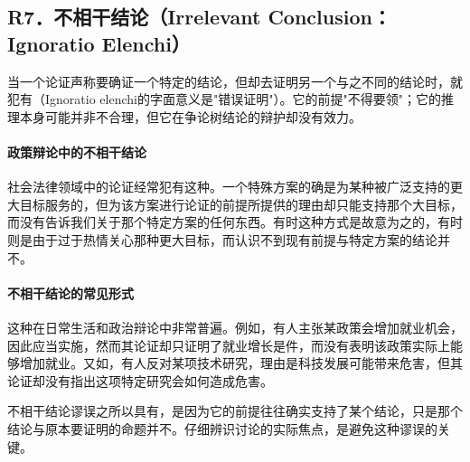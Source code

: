 \subsection{R7．不相干结论（Irrelevant Conclusion：Ignoratio Elenchi）}

\begin{theorembox}[title=不相干结论谬误的定义]
当一个论证声称要确证一个特定的结论，但却去证明另一个与之不同的结论时，就犯有（Ignoratio elenchi的字面意义是"错误证明"）。它的前提"不得要领"；它的推理本身可能并非不合理，但它在争论树结论的辩护却没有效力。
\end{theorembox}

\paragraph{政策辩论中的不相干结论}
社会法律领域中的论证经常犯有这种。一个特殊方案的确是为某种被广泛支持的更大目标服务的，但为该方案进行论证的前提所提供的理由却只能支持那个大目标，而没有告诉我们关于那个特定方案的任何东西。有时这种方式是故意为之的，有时则是由于过于热情关心那种更大目标，而认识不到现有前提与特定方案的结论并不。

\paragraph{不相干结论的常见形式}
\begin{examplebox}[title=不相干结论的常见形式]
这种在日常生活和政治辩论中非常普遍。例如，有人主张某政策会增加就业机会，因此应当实施，然而其论证却只证明了就业增长是件，而没有表明该政策实际上能够增加就业。又如，有人反对某项技术研究，理由是科技发展可能带来危害，但其论证却没有指出这项特定研究会如何造成危害。
\end{examplebox}

不相干结论谬误之所以具有，是因为它的前提往往确实支持了某个结论，只是那个结论与原本要证明的命题并不。仔细辨识讨论的实际焦点，是避免这种谬误的关键。